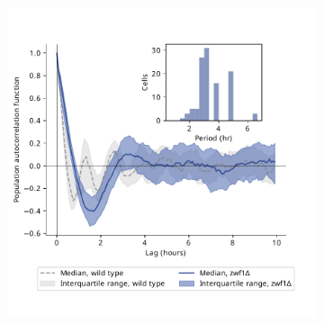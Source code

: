\begin{figure}
\begin{subfigure}[t]{0.45\textwidth}
   \includegraphics[width=\textwidth]{zwf1egf_409_12.pdf}
   \caption{
   }
   \label{fig:biology-zwf1-acf}
  \end{subfigure}


\end{figure}
